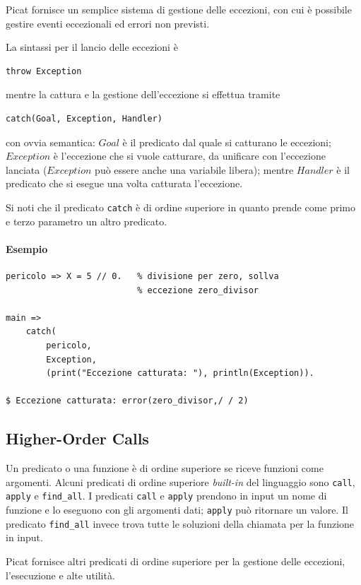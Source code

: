 \documentclass[12pt,a4paper,openright]{book} %
\begin{document}
Picat fornisce un semplice sistema di gestione delle eccezioni, con
cui è possibile gestire eventi eccezionali ed errori non previsti.

La sintassi per il lancio delle eccezioni è
\begin{lstlisting}
throw Exception
\end{lstlisting}
mentre la cattura e la gestione dell'eccezione si effettua tramite
\begin{lstlisting}
catch(Goal, Exception, Handler)
\end{lstlisting}
con ovvia semantica: $Goal$ è il predicato dal quale si catturano le
eccezioni; $Exception$ è l'eccezione che si vuole catturare, da
unificare con l'eccezione lanciata ($Exception$ può essere anche una
variabile libera); mentre $Handler$ è il predicato che si esegue una
volta catturata l'eccezione.

Si noti che il predicato \texttt{catch} è di ordine superiore in
quanto prende come primo e terzo parametro un altro predicato.

\paragraph{Esempio}

\begin{verbatim}
pericolo => X = 5 // 0.   % divisione per zero, sollva
                          % eccezione zero_divisor

main =>
    catch(
        pericolo, 
        Exception, 
        (print("Eccezione catturata: "), println(Exception)).

$ Eccezione catturata: error(zero_divisor,/ / 2)
\end{verbatim}

\subsection{Higher-Order Calls}
\label{subsec:picat_advanced_hoc}

Un predicato o una funzione è di ordine superiore se riceve funzioni
come argomenti. Alcuni predicati di ordine superiore \emph{built-in}
del linguaggio sono \verb|call|, \verb|apply| e \verb|find_all|. I
predicati \verb|call| e \verb|apply| prendono in input un nome di
funzione e lo eseguono con gli argomenti dati; \verb|apply| può
ritornare un valore. Il predicato \verb|find_all| invece trova tutte
le soluzioni della chiamata per la funzione in input.

Picat fornisce altri predicati di ordine superiore per la gestione
delle eccezioni, l'esecuzione e alte utilità.
\end{document}
